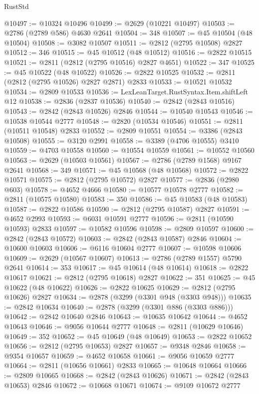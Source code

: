 \begin{lexlean}{RustStd}
\begin{coremodule}
{\begin{coremodule}
{{{{{{{{{{{{{{{{{{{{{{{{{{{{{{{{{@10497 := @10324 @10496
@10499 := @2629 (@10221 @10497)
@10503 := @2786 (@2789 @586) @4630 @2641
@10504 := 348
@10507 := @45 @10504 (@48 @10504)
@10508 := @3082 @10507
@10511 := @2812 (@2795 @10508) @2827
@10512 := 346
@10515 := @45 @10512 (@48 @10512)
@10516 := @2822 @10515
@10521 := @2811 (@2812 (@2795 @10516) @2827 @4651)
@10522 := 347
@10525 := @45 @10522 (@48 @10522)
@10526 := @2822 @10525
@10532 := @2811 (@2812 (@2795 @10526) @2827 @2871) @2833
@10533 := @10521 @10532
@10534 := @2809 @10533
@10536 := LexLeanTarget.RustSyntax.Item.shiftLeft @12
@10538 := @2836 (@2837 @10536)
@10540 := @2842 (@2843 @10516)
@10543 := @2842 (@2843 @10526) @2846
@10544 := @10540 @10543
@10546 := @10538 @10544 @2777
@10548 := @2820 (@10534 @10546)
@10551 := @2811 (@10511 @10548) @2833
@10552 := @2809 @10551
@10554 := @3386 (@2843 @10508)
@10555 := @3120 @2991
@10558 := @3389 (@4706 @10555) @3410
@10559 := @4703 @10558
@10560 := @10554 @10559
@10561 := @10552 @10560
@10563 := @2629 (@10503 @10561)
@10567 := @2786 (@2789 @1568) @9167 @2641
@10568 := 349
@10571 := @45 @10568 (@48 @10568)
@10572 := @2822 @10571
@10575 := @2812 (@2795 @10572) @2827
@10577 := @2836 (@2980 @603)
@10578 := @4652 @4666
@10580 := @10577 @10578 @2777
@10582 := @2811 (@10575 @10580)
@10583 := 350
@10586 := @45 @10583 (@48 @10583)
@10587 := @2822 @10586
@10590 := @2812 (@2795 @10587) @2827
@10591 := @4652 @2993
@10593 := @6031 @10591 @2777
@10596 := @2811 (@10590 @10593) @2833
@10597 := @10582 @10596
@10598 := @2809 @10597
@10600 := @2842 (@2843 @10572)
@10603 := @2842 (@2843 @10587) @2846
@10604 := @10600 @10603
@10606 := @6116 @10604 @2777
@10607 := @10598 @10606
@10609 := @2629 (@10567 @10607)
@10613 := @2786 (@2789 @1557) @5790 @2641
@10614 := 353
@10617 := @45 @10614 (@48 @10614)
@10618 := @2822 @10617
@10621 := @2812 (@2795 @10618) @2827
@10622 := 351
@10625 := @45 @10622 (@48 @10622)
@10626 := @2822 @10625
@10629 := @2812 (@2795 @10626) @2827
@10634 := @2878 (@3299 (@3301 @948 (@3303 @948)))
@10635 := @2842 @10634
@10640 := @2878 (@3299 (@3301 @886 (@3303 @886)))
@10642 := @2842 @10640 @2846
@10643 := @10635 @10642
@10644 := @4652 @10643
@10646 := @9056 @10644 @2777
@10648 := @2811 (@10629 @10646)
@10649 := 352
@10652 := @45 @10649 (@48 @10649)
@10653 := @2822 @10652
@10656 := @2812 (@2795 @10653) @2827
@10657 := @9348 @2846
@10658 := @9354 @10657
@10659 := @4652 @10658
@10661 := @9056 @10659 @2777
@10664 := @2811 (@10656 @10661) @2833
@10665 := @10648 @10664
@10666 := @2809 @10665
@10668 := @2842 (@2843 @10626)
@10671 := @2842 (@2843 @10653) @2846
@10672 := @10668 @10671
@10674 := @9109 @10672 @2777
}}}}}}}}}}}}}}}}}}}}}}}}}}}}}}}}}
\end{coremodule}}
\end{coremodule}
\end{lexlean}
